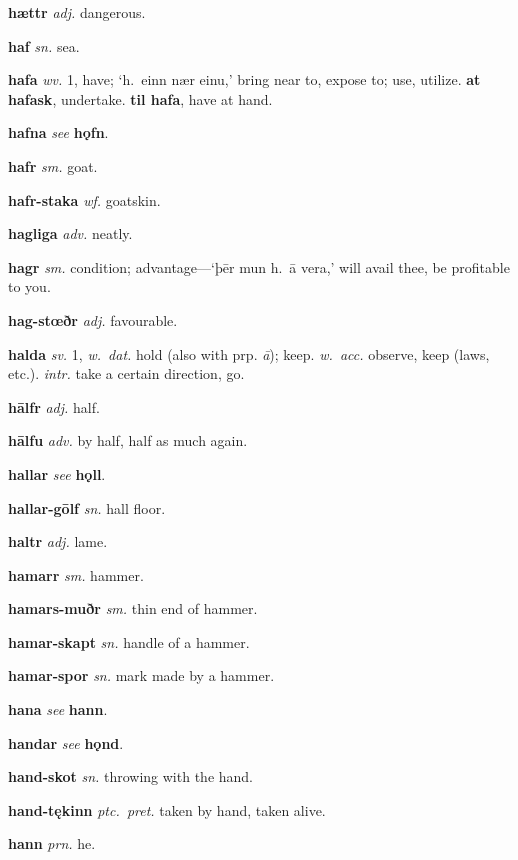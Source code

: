 \documentclass[12pt,letterpaper]{book}
\begin{document}
\noindent
\textbf{hættr} \textit{adj.} dangerous.

\noindent
\textbf{haf} \textit{sn.} sea.

\noindent
\textbf{hafa} \textit{wv.} 1, have; `h.\ einn nær einu,' bring near to,
	expose to; use, utilize.  \textbf{at hafask}, undertake.  \textbf{til
	hafa}, have at hand.

\noindent
\textbf{hafna} \textit{} \textit{see} \textbf{hǫfn}.

\noindent
\textbf{hafr} \textit{sm.} goat.

\noindent
\textbf{hafr-staka} \textit{wf.} goatskin.

\noindent
\textbf{hagliga} \textit{adv.} neatly.

\noindent
\textbf{hagr} \textit{sm.} condition; advantage---`þēr mun h.\ ā vera,'
	will avail thee, be profitable to you.

\noindent
\textbf{hag-stœðr} \textit{adj.} favourable.

\noindent
\textbf{halda} \textit{sv.} 1, \textit{w.\ dat.} hold (also with prp.
	\textit{ā}); keep.  \textit{w.\ acc.} observe, keep (laws, etc.).
	\textit{intr.} take a certain direction, go.

\noindent
\textbf{hālfr} \textit{adj.} half.

\noindent
\textbf{hālfu} \textit{adv.} by half, half as much again.

\noindent
\textbf{hallar} \textit{} \textit{see} \textbf{hǫll}.

\noindent
\textbf{hallar-gōlf} \textit{sn.} hall floor.

\noindent
\textbf{haltr} \textit{adj.} lame.

\noindent
\textbf{hamarr} \textit{sm.} hammer.

\noindent
\textbf{hamars-muðr} \textit{sm.} thin end of hammer.

\noindent
\textbf{hamar-skapt} \textit{sn.} handle of a hammer.

\noindent
\textbf{hamar-spor} \textit{sn.} mark made by a hammer.

\noindent
\textbf{hana} \textit{} \textit{see} \textbf{hann}.

\noindent
\textbf{handar} \textit{} \textit{see} \textbf{hǫnd}.

\noindent
\textbf{hand-skot} \textit{sn.} throwing with the hand.

\noindent
\textbf{hand-tękinn} \textit{ptc.\ pret.} taken by hand, taken alive.

\noindent
\textbf{hann} \textit{prn.} he.
\end{document}
